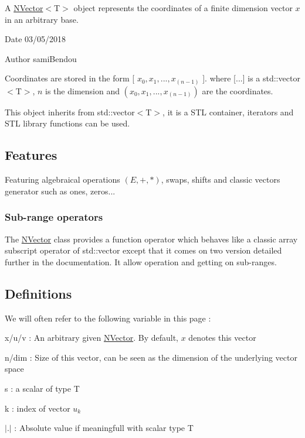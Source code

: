 A {\ttfamily \mbox{\hyperlink{class_n_vector}{N\+Vector}}$<$T$>$} object represents the coordinates of a finite dimension vector $ x $ in an arbitrary base. 

\begin{DoxyDate}{Date}
03/05/2018 
\end{DoxyDate}
\begin{DoxyAuthor}{Author}
sami\+Bendou
\end{DoxyAuthor}
Coordinates are stored in the form {\ttfamily \mbox{[}} $ x_0, x_1, ..., x_{(n-1)} $ {\ttfamily \mbox{]}}. where {\ttfamily \mbox{[}...\mbox{]}} is a {\ttfamily std\+::vector$<$T$>$}, $ n $ is the dimension and $ (x_0, x_1, ..., x_{(n-1)}) $ are the coordinates.

This object inherits from {\ttfamily std\+::vector$<$T$>$}, it is a S\+TL container, iterators and S\+TL library functions can be used.\hypertarget{class_n_vector_Features}{}\subsection{Features}\label{class_n_vector_Features}
Featuring algebraical operations $ (E, +, *) $, swaps, shifts and classic vectors generator such as ones, zeros...\hypertarget{class_n_vector_FuncOpVec}{}\subsubsection{Sub-\/range operators}\label{class_n_vector_FuncOpVec}
The {\ttfamily \mbox{\hyperlink{class_n_vector}{N\+Vector}}} class provides a function operator which behaves like a classic array subscript operator of {\ttfamily std\+::vector} except that it comes on two version detailed further in the documentation. It allow operation and getting on sub-\/ranges.\hypertarget{class_n_vector_Definitions}{}\subsection{Definitions}\label{class_n_vector_Definitions}
We will often refer to the following variable in this page \+:
\begin{DoxyItemize}
\item {\ttfamily x}/{\ttfamily u}/{\ttfamily v} \+: An arbitrary given \mbox{\hyperlink{class_n_vector}{N\+Vector}}. By default, $ x $ denotes {\ttfamily this} vector
\item {\ttfamily n}/{\ttfamily dim} \+: Size of this vector, can be seen as the dimension of the underlying vector space
\item {\ttfamily s} \+: a scalar of type {\ttfamily T}
\item {\ttfamily k} \+: index of vector $ u_k $
\item $ |.| $ \+: Absolute value if meaningfull with scalar type {\ttfamily T} 
\end{DoxyItemize}

